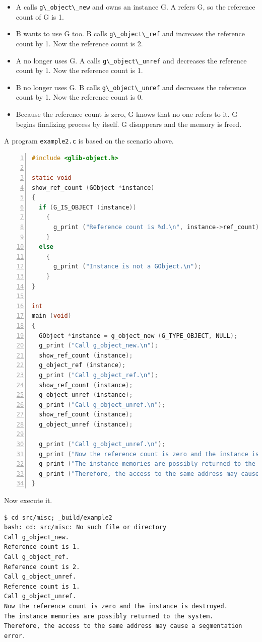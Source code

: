 \begin{itemize}
\tightlist
\item
  A calls \passthrough{\lstinline!g\_object\_new!} and owns an instance
  G. A refers G, so the reference count of G is 1.
\item
  B wants to use G too. B calls \passthrough{\lstinline!g\_object\_ref!}
  and increases the reference count by 1. Now the reference count is 2.
\item
  A no longer uses G. A calls \passthrough{\lstinline!g\_object\_unref!}
  and decreases the reference count by 1. Now the reference count is 1.
\item
  B no longer uses G. B calls \passthrough{\lstinline!g\_object\_unref!}
  and decreases the reference count by 1. Now the reference count is 0.
\item
  Because the reference count is zero, G knows that no one refers to it.
  G begins finalizing process by itself. G disappears and the memory is
  freed.
\end{itemize}

A program \passthrough{\lstinline!example2.c!} is based on the scenario
above.

\begin{lstlisting}[language=C, numbers=left]
#include <glib-object.h>

static void
show_ref_count (GObject *instance)
{
  if (G_IS_OBJECT (instance))
    {
      g_print ("Reference count is %d.\n", instance->ref_count);
    }
  else
    {
      g_print ("Instance is not a GObject.\n");
    }
}

int
main (void)
{
  GObject *instance = g_object_new (G_TYPE_OBJECT, NULL);
  g_print ("Call g_object_new.\n");
  show_ref_count (instance);
  g_object_ref (instance);
  g_print ("Call g_object_ref.\n");
  show_ref_count (instance);
  g_object_unref (instance);
  g_print ("Call g_object_unref.\n");
  show_ref_count (instance);
  g_object_unref (instance);

  g_print ("Call g_object_unref.\n");
  g_print ("Now the reference count is zero and the instance is destroyed.\n");
  g_print ("The instance memories are possibly returned to the system.\n");
  g_print ("Therefore, the access to the same address may cause a segmentation error.\n");
}
\end{lstlisting}

Now execute it.

\begin{lstlisting}
$ cd src/misc; _build/example2
bash: cd: src/misc: No such file or directory
Call g_object_new.
Reference count is 1.
Call g_object_ref.
Reference count is 2.
Call g_object_unref.
Reference count is 1.
Call g_object_unref.
Now the reference count is zero and the instance is destroyed.
The instance memories are possibly returned to the system.
Therefore, the access to the same address may cause a segmentation error.
\end{lstlisting}

